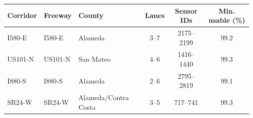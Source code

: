 \begin{tabular}{lllccc}
\toprule
Corridor & Freeway & County & Lanes & Sensor IDs & Min. usable (\%) \\
\midrule
I580-E & I580-E & Alameda & 3--7 & 2175--2199 & 99.2 \\
US101-N & US101-N & San Mateo & 4--6 & 1416--1440 & 99.3 \\
I880-S & I880-S & Alameda & 2--6 & 2795--2819 & 99.1 \\
SR24-W & SR24-W & Alameda/Contra Costa & 3--5 & 717--741 & 99.3 \\
\bottomrule
\end{tabular}
